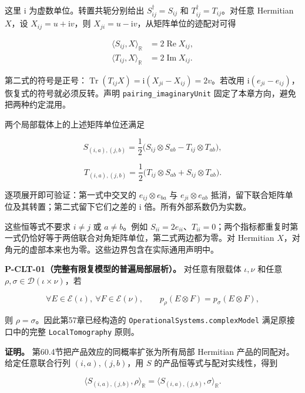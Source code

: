 \documentclass[
  11pt,
  oneside]{book}
\begin{document}
这里 \(\mathrm i\) 为虚数单位。转置共轭分别给出
\(S_{ij}^\dagger=S_{ij}\) 和 \(T_{ij}^\dagger=T_{ij}\)。对任意 Hermitian
\(X\)，设 \(X_{ij}=u+\mathrm i v\)，则
\(X_{ji}=u-\mathrm i v\)，从矩阵单位的迹配对可得

\[
\begin{aligned}
\langle S_{ij},X\rangle_{\mathbb R}
&=2\operatorname{Re}X_{ij},\\
\langle T_{ij},X\rangle_{\mathbb R}
&=2\operatorname{Im}X_{ij}.
\end{aligned}
\]

第二式的符号是正号：\(\operatorname{Tr}(T_{ij}X)=\mathrm i(X_{ji}-X_{ij})=2v\)。若改用
\(\mathrm i(e_{ji}-e_{ij})\)，恢复式的符号就必须反转。声明
\texttt{pairing\_\allowbreak imaginary\allowbreak Unit} 固定了本章方向，避免把两种约定混用。

两个局部载体上的上述矩阵单位还满足

\[
S_{(i,a),(j,b)}
=\frac12\bigl(S_{ij}\otimes S_{ab}
-T_{ij}\otimes T_{ab}\bigr),
\]

\[
T_{(i,a),(j,b)}
=\frac12\bigl(T_{ij}\otimes S_{ab}
+S_{ij}\otimes T_{ab}\bigr).
\]

逐项展开即可验证：第一式中交叉的 \(e_{ij}\otimes e_{ba}\) 与
\(e_{ji}\otimes e_{ab}\)
抵消，留下联合矩阵单位及其转置；第二式留下它们之差的 \(\mathrm i\)
倍。所有外部系数仍为实数。

这些恒等式不要求 \(i\ne j\) 或 \(a\ne b\)。例如
\(S_{ii}=2e_{ii}\)、\(T_{ii}=0\)；两个指标都重复时第一式仍恰好等于两倍联合对角矩阵单位，第二式两边都为零。对
Hermitian \(X\)，对角元的虚部本来也为零。这些边界包含在实际通用声明中。

\protect\hypertarget{p-clt-01}{}{}

\textbf{P-CLT-01（完整有限复模型的普遍局部层析）。} 对任意有限载体
\(\iota,\nu\) 和任意 \(\rho,\sigma\in\mathcal D(\iota\times\nu)\)，若

\[
\forall E\in\mathcal E(\iota),\ 
\forall F\in\mathcal E(\nu),\qquad
p_\rho(E\otimes F)=p_\sigma(E\otimes F),
\]

则 \(\rho=\sigma\)。因此第57章已经构造的
\texttt{Operational\allowbreak Systems.\allowbreak complex\allowbreak Model} 满足原接口中的完整
\texttt{Local\allowbreak Tomography} 原则。

\textbf{证明。} 第60.4节把产品效应的同概率扩张为所有局部 Hermitian
产品的同配对。给定任意联合行列 \((i,a),(j,b)\)，用 \(S\)
的产品恒等式与配对实线性，得到

\[
\langle S_{(i,a),(j,b)},\rho\rangle_{\mathbb R}
=\langle S_{(i,a),(j,b)},\sigma\rangle_{\mathbb R}.
\]
\end{document}
